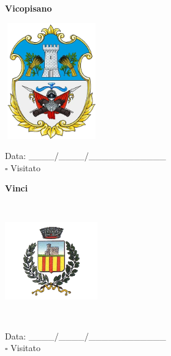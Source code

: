 \documentclass[a5paper,12pt]{article}
\begin{document}
\newpage

\noindent
\begin{minipage}[t]{0.45\textwidth}
    \begin{center}
        \textbf{Vicopisano}
    \end{center}
    \vspace{-0.5cm} %
    \begin{center}
        \includegraphics[height= 5cm, width=4cm]{Toscana/Stemma Vicopisano.png}
    \end{center}
    \vspace{-0.4cm} %
    \begin{flushleft}
        Data: \_\_\_\_/\_\_\_\_/\_\_\_\_\_\_\_\_\_\_\_\_ \\
        $\square$ Visitato
    \end{flushleft}
\end{minipage}
\hfill
\noindent
\begin{minipage}[t]{0.45\textwidth}
    \begin{center}
        \textbf{Vinci}
    \end{center}
    \vspace{-0.5cm} %
    \begin{center}
        \includegraphics[height= 5cm, width=4cm]{Toscana/Stemma Vinci.png}
    \end{center}
    \vspace{-0.4cm} %
    \begin{flushleft}
        Data: \_\_\_\_/\_\_\_\_/\_\_\_\_\_\_\_\_\_\_\_\_ \\
        $\square$ Visitato
    \end{flushleft}
\end{minipage}
\end{document}

